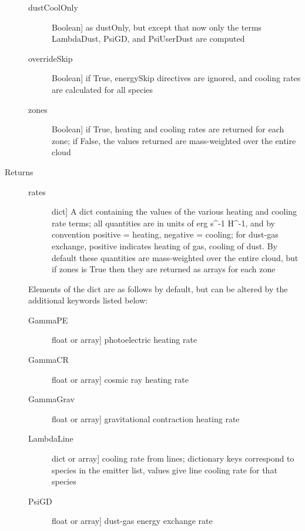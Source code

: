 \documentclass[letterpaper,10pt,english]{sphinxmanual}
\begin{document}
\begin{fulllineitems}
\begin{fulllineitems}
\begin{description}
\begin{description}
\item[{dustCoolOnly}] \leavevmode{[}Boolean{]}
as dustOnly, but except that now only the terms
LambdaDust, PsiGD, and PsiUserDust are computed

\item[{overrideSkip}] \leavevmode{[}Boolean{]}
if True, energySkip directives are ignored, and cooling
rates are calculated for all species

\item[{zones}] \leavevmode{[}Boolean{]}
if True, heating and cooling rates are returned for each
zone; if False, the values returned are mass-weighted over
the entire cloud

\end{description}

\item[{Returns}] \leavevmode\begin{description}
\item[{rates}] \leavevmode{[}dict{]}
A dict containing the values of the various heating and
cooling rate terms; all quantities are in units of erg s\textasciicircum{}-1
H\textasciicircum{}-1, and by convention positive = heating, negative =
cooling; for dust-gas exchange, positive indicates heating
of gas, cooling of dust. By default these quantities are
mass-weighted over the entire cloud, but if zones is True
then they are returned as arrays for each zone

\end{description}

Elements of the dict are as follows by default, but can be
altered by the additional keywords listed below:
\begin{description}
\item[{GammaPE}] \leavevmode{[}float or array{]}
photoelectric heating rate

\item[{GammaCR}] \leavevmode{[}float or array{]}
cosmic ray heating rate

\item[{GammaGrav}] \leavevmode{[}float or array{]}
gravitational contraction heating rate

\item[{LambdaLine}] \leavevmode{[}dict or array{]}
cooling rate from lines; dictionary keys correspond to
species in the emitter list, values give line cooling
rate for that species

\item[{PsiGD}] \leavevmode{[}float or array{]}
dust-gas energy exchange rate


\end{description}
\end{description}
\end{fulllineitems}
\end{fulllineitems}
\end{document}

